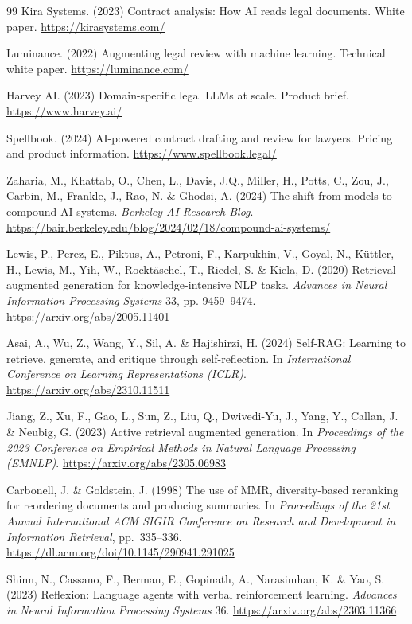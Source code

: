 \documentclass{article}
\begin{document}
\begin{thebibliography}{99}
Kira Systems. (2023) Contract analysis: How AI reads legal documents.
White paper. \url{https://kirasystems.com/}

Luminance. (2022) Augmenting legal review with machine learning.
Technical white paper. \url{https://luminance.com/}

Harvey AI. (2023) Domain-specific legal LLMs at scale. Product brief.
\url{https://www.harvey.ai/}

Spellbook. (2024) AI-powered contract drafting and review for lawyers.
Pricing and product information. \url{https://www.spellbook.legal/}

Zaharia, M., Khattab, O., Chen, L., Davis, J.Q., Miller, H., Potts, C.,
Zou, J., Carbin, M., Frankle, J., Rao, N. \& Ghodsi, A. (2024) The shift
from models to compound AI systems. \emph{Berkeley AI Research Blog}.
\url{https://bair.berkeley.edu/blog/2024/02/18/compound-ai-systems/}

Lewis, P., Perez, E., Piktus, A., Petroni, F., Karpukhin, V., Goyal, N.,
K\"uttler, H., Lewis, M., Yih, W., Rockt\"aschel, T., Riedel, S. \&
Kiela, D. (2020) Retrieval-augmented generation for knowledge-intensive
NLP tasks. \emph{Advances in Neural Information Processing Systems} 33,
pp. 9459--9474. \url{https://arxiv.org/abs/2005.11401}

Asai, A., Wu, Z., Wang, Y., Sil, A. \& Hajishirzi, H. (2024) Self-RAG:
Learning to retrieve, generate, and critique through self-reflection.
In \emph{International Conference on Learning Representations (ICLR)}.
\url{https://arxiv.org/abs/2310.11511}

Jiang, Z., Xu, F., Gao, L., Sun, Z., Liu, Q., Dwivedi-Yu, J., Yang, Y.,
Callan, J. \& Neubig, G. (2023) Active retrieval augmented generation.
In \emph{Proceedings of the 2023 Conference on Empirical Methods in
Natural Language Processing (EMNLP)}.
\url{https://arxiv.org/abs/2305.06983}

Carbonell, J. \& Goldstein, J. (1998) The use of MMR, diversity-based
reranking for reordering documents and producing summaries. In
\emph{Proceedings of the 21st Annual International ACM SIGIR Conference
on Research and Development in Information Retrieval}, pp.~335--336.
\url{https://dl.acm.org/doi/10.1145/290941.291025}

Shinn, N., Cassano, F., Berman, E., Gopinath, A., Narasimhan, K. \&
Yao, S. (2023) Reflexion: Language agents with verbal reinforcement
learning. \emph{Advances in Neural Information Processing Systems} 36.
\url{https://arxiv.org/abs/2303.11366}


\end{thebibliography}
\end{document}
